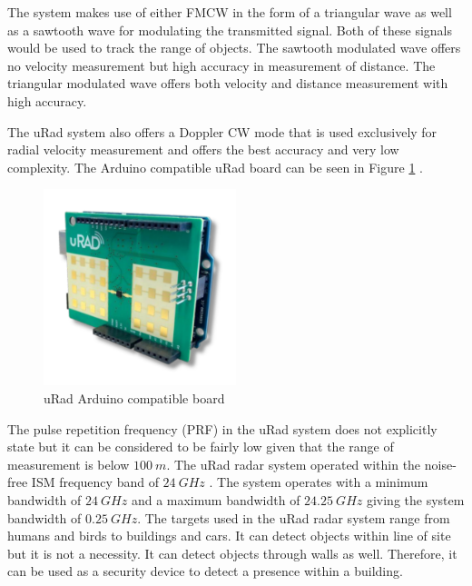The system makes use of either FMCW in the form of a triangular wave as well as a sawtooth wave for modulating the transmitted signal. Both of these signals would be used to track the range of objects. The sawtooth modulated wave offers no velocity measurement but high accuracy in measurement of distance. The triangular modulated wave offers both velocity and distance measurement with high accuracy.

The uRad system also offers a Doppler CW mode that is used exclusively for radial velocity measurement and offers the best accuracy and very low complexity. The Arduino compatible uRad board can be seen in Figure \ref{uRadArduino} \cite{noauthor_urad_2018}.

\begin{figure}[h!]
    \centering
    \includegraphics[width = 0.5\textwidth]{images/uRad.pdf}
    \caption{uRad Arduino compatible board \cite{noauthor_urad_2018-1}}\label{uRadArduino}
\end{figure}

The pulse repetition frequency (PRF) in the uRad system does not explicitly state but it can be considered to be fairly low given that the range of measurement is below $100\ m$. The uRad radar system operated within the noise-free ISM frequency band of $24\ GHz$ \cite{noauthor_microwave_2019}. The system operates with a minimum bandwidth of $24\ GHz$ and a maximum bandwidth of $24.25\ GHz$ giving the system bandwidth of $0.25\ GHz$. The targets used in the uRad radar system range from humans and birds to buildings and cars. It can detect objects within line of site but it is not a necessity. It can detect objects through walls as well. Therefore, it can be used as a security device to detect a presence within a building.


